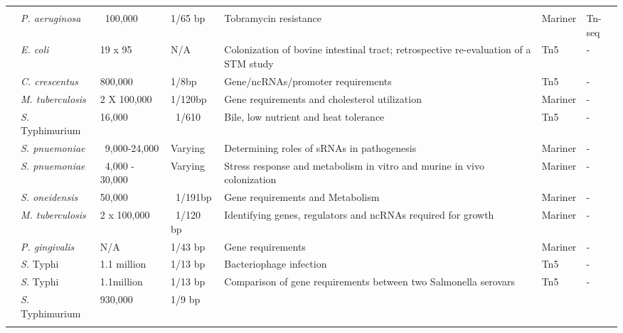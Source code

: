 \begin{landscape}
\begin{longtable}{ l
    				l
				l
				l
				p{2in}
				l
				l}
          &       &       &  &       &       &  \\
    \multirow{2}[0]{*}{\textcite{Gallagher2011}}  & \multirow{2}[0]{*}{\textit{P. aeruginosa}} & \multirow{2}[0]{*}{~100,000} & \multirow{2}[0]{*}{1/65 bp} & \multirow{2}[0]{2in}{Tobramycin resistance} & \multirow{2}[0]{*}{Mariner} & \multirow{2}[0]{*}{Tn-seq} \\
          &       &       &       &       &       & (circle method)  \\
    \textcite{Eckert2011}  & \textit{E. coli} & 19 x 95 & N/A & Colonization of bovine intestinal tract; retrospective re-evaluation of a STM study & Tn5   & - \\
    \textcite{Christen2011}  & \textit{C. crescentus} & 800,000 & 1/8bp & Gene/ncRNAs/promoter requirements & Tn5   & - \\
    \textcite{Griffin2011}  & \textit{M. tuberculosis} & 2 X 100,000 & 1/120bp & Gene requirements and cholesterol utilization & Mariner & - \\
    \textcite{Khatiwara2012}  & {\it S.} Typhimurium & 16,000 & ~1/610 & Bile, low nutrient and heat tolerance & Tn5   & - \\
    \textcite{Mann2012}  & \textit{S. pnuemoniae} & ~9,000-24,000 & Varying & Determining roles of sRNAs in pathogenesis & Mariner & - \\
    \textcite{Opijnen2012}  & \textit{S. pnuemoniae} & ~4,000 - 30,000 & Varying & Stress response and metabolism in vitro and murine in vivo colonization & Mariner & - \\
    \textcite{Brutinel2012} & \textit{S. oneidensis} & 50,000 &  ~1/191bp & Gene requirements and Metabolism & Mariner & - \\
    \textcite{Zhang2012} & \textit{M. tuberculosis} & 2 x 100,000 &  ~1/120 bp & Identifying genes, regulators and ncRNAs required for growth & Mariner & - \\
    \textcite{Klein2012}  & \textit{P. gingivalis} & N/A   & 1/43 bp & Gene requirements & Mariner & - \\
    \textcite{Pickard2013}  & {\it S.} Typhi & 1.1 million & 1/13 bp & Bacteriophage infection & Tn5   & - \\
    \multirow{2}[1]{*}{\textcite{Barquist2013a}}  & {\it S.} Typhi & 1.1million & 1/13 bp & \multirow{2}[1]{2in}{Comparison of gene requirements between two Salmonella serovars} & \multirow{2}[1]{*}{Tn5} & \multirow{2}[1]{*}{-} \\
          & {\it S.} Typhimurium & 930,000 & 1/9 bp &       &       &  \\
    \bottomrule
    \label{tab:studies}%
    \end{longtable}%
\end{landscape}%
\endgroup

